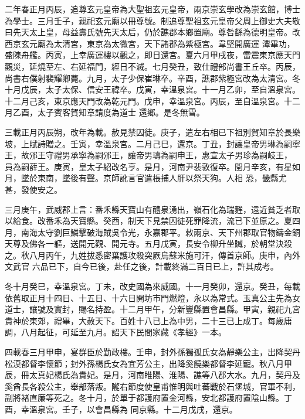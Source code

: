 \begin{pinyinscope}
 二年春正月丙辰，追尊玄元皇帝為大聖祖玄元皇帝，兩京崇玄學改為崇玄館，博士為學士。三月壬子，親祀玄元廟以冊尊號。制追尊聖祖玄元皇帝父周上御史大夫敬曰先天太上皇，母益壽氏號先天太后，仍於譙郡本鄉置廟。尊咎繇為德明皇帝。改西京玄元廟為太清宮，東京為太微宮，天下諸郡為紫極宮。韋堅開廣運
 潭畢功，盛陳舟艦。丙寅，上幸廣運樓以觀之，即日還宮。夏六月甲戌夜，雷震東京應天門觀災，延燒至左、右延福門，經日不滅。七月癸丑，致仕禮部尚書王丘卒。丙辰，尚書右僕射裴耀卿薨。九月，太子少保崔琳卒。辛酉，譙郡紫極宮改為太清宮。冬十月戊辰，太子太保、信安王禕卒。戊寅，幸溫泉宮。十一月乙卯，至自溫泉宮。十二月己亥，東京應天門改為乾元門。戊申，幸溫泉宮。丙辰，至自溫泉宮。十二月乙酉，太子賓客賀知章請度為道士
 還鄉。是冬無雪。



 三載正月丙辰朔，改年為載。赦見禁囚徒。庚子，遣左右相已下祖別賀知章於長樂坡，上賦詩贈之。壬寅，幸溫泉宮。二月己巳，還京。丁丑，封讓皇帝男琳為嗣寧王，故邠王守禮男承寧為嗣邠王，讓帝男璹為嗣申王，惠宣太子男珍為嗣岐王，員為嗣薛王。庚寅，皇太子紹改名亨。是月，河南尹裴敦復卒。閏月辛亥，有星如月，墜於東南，墜後有聲。京師訛言官遣棖捕人肝以祭天狗。人相
 恐，畿縣尤甚，發使安之。



 三月庚午，武威郡上言：番禾縣天寶山有醴泉湧出，嶺石化為瑞麰，遠近貧乏者取以給食。改番禾為天寶縣。癸酉，制天下見禁囚徒死罪降流，流已下並原之。夏四月，南海太守劉巨鱗擊破海賊吳令光，永嘉郡平。敕兩京、天下州郡取官物鑄金銅天尊及佛各一軀，送開元觀、開元寺。五月戊寅，長安令柳升坐贓，於朝堂決殺之。秋八月丙午，九姓拔悉密葉護攻殺突厥烏蘇米施可汗，傳首京師。庚申，內外文武官
 六品已下，自今已後，赴任之後，計載終滿二百日已上，許其成考。



 冬十月癸巳，幸溫泉宮。丁未，改史國為來威國。十一月癸卯，還京。癸丑，每載依舊取正月十四日、十五日、十六日開坊市門燃燈，永以為常式。玉真公主先為女道士，讓號及實封，賜名持盈。十二月甲午，分新豐縣置會昌縣。甲寅，親祀九宮貴神於東郊，禮畢，大赦天下。百姓十八已上為中男，二十三已上成丁。每歲庸調，八月起征，可延至九月。詔天下民間家藏《孝經》一本。



 四載春三月甲申，宴群臣於勤政樓。壬申，封外孫獨孤氏女為靜樂公主，出降契丹松漠都督李懷節；封外孫楊氏女為宜芳公主，出降奚饒樂都督李延寵。秋八月甲辰，冊太真妃楊氏為貴妃。是月，河南睢陽、淮陽、譙等八郡大水。九月，契丹及奚酋長各殺公主，舉部落叛。隴右節度使皇甫惟明與吐蕃戰於石堡城，官軍不利，副將褚直廉等死之。冬十月，於單于都護府置金河縣，安北都護府置陰山縣。丁酉，幸溫泉宮。壬子，以會昌縣為
 同京縣。十二月戊戌，還京。




\end{pinyinscope}
